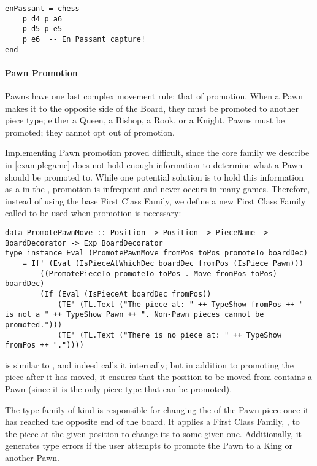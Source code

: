 \begin{lstlisting}
enPassant = chess
    p d4 p a6
    p d5 p e5
    p e6  -- En Passant capture!
end
\end{lstlisting}

\paragraph{Pawn Promotion}

Pawns have one last complex movement rule; that of promotion. When a Pawn makes it to the opposite side of the Board, they must be promoted to another piece type; either a Queen, a Bishop, a Rook, or a Knight. Pawns must be promoted; they cannot opt out of promotion.

Implementing Pawn promotion proved difficult, since the core  family we describe in \cref{examplegame} does not hold enough information to determine what a Pawn should be promoted to. While one potential solution is to hold this information as a  in the , promotion is infrequent and never occurs in many games. Therefore, instead of using the base  First Class Family, we define a new First Class Family called  to be used when promotion is necessary:

\begin{lstlisting}
data PromotePawnMove :: Position -> Position -> PieceName -> BoardDecorator -> Exp BoardDecorator
type instance Eval (PromotePawnMove fromPos toPos promoteTo boardDec)
    = If' (Eval (IsPieceAtWhichDec boardDec fromPos (IsPiece Pawn)))
        ((PromotePieceTo promoteTo toPos . Move fromPos toPos) boardDec)
        (If (Eval (IsPieceAt boardDec fromPos))
            (TE' (TL.Text ("The piece at: " ++ TypeShow fromPos ++ " is not a " ++ TypeShow Pawn ++ ". Non-Pawn pieces cannot be promoted.")))
            (TE' (TL.Text ("There is no piece at: " ++ TypeShow fromPos ++ "."))))
\end{lstlisting}

 is similar to , and indeed calls it internally; but in addition to promoting the piece after it has moved, it ensures that the position to be moved from contains a Pawn (since it is the only piece type that can be promoted).

The type family  of kind  is responsible for changing the  of the Pawn piece once it has reached the opposite end of the board. It applies a First Class Family, , to the piece at the given position to change its  to some given one. Additionally, it generates type errors if the user attempts to promote the Pawn to a King or another Pawn.

